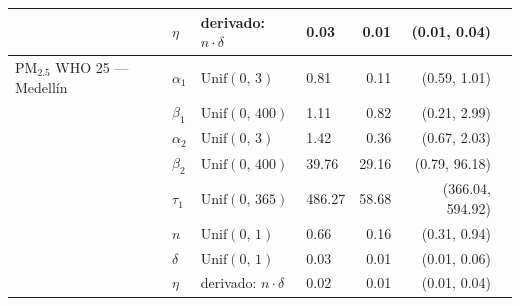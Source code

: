 \begin{longtable}{llllrrr}
 & $\eta$ & derivado: $n \cdot \delta$ & 0.03 & 0.01 & (0.01, 0.04) \\
\midrule
PM$_{2.5}$ WHO 25 --- Medell\'{i}n & $\alpha_{1}$ & $\text{Unif}(0,\,3)$ & 0.81 & 0.11 & (0.59, 1.01) \\
 & $\beta_{1}$ & $\text{Unif}(0,\,400)$ & 1.11 & 0.82 & (0.21, 2.99) \\
 & $\alpha_{2}$ & $\text{Unif}(0,\,3)$ & 1.42 & 0.36 & (0.67, 2.03) \\
 & $\beta_{2}$ & $\text{Unif}(0,\,400)$ & 39.76 & 29.16 & (0.79, 96.18) \\
 & $\tau_{1}$ & $\text{Unif}(0,\,365)$ & 486.27 & 58.68 & (366.04, 594.92) \\
 & $n$ & $\text{Unif}(0,\,1)$ & 0.66 & 0.16 & (0.31, 0.94) \\
 & $\delta$ & $\text{Unif}(0,\,1)$ & 0.03 & 0.01 & (0.01, 0.06) \\
 & $\eta$ & derivado: $n \cdot \delta$ & 0.02 & 0.01 & (0.01, 0.04) \\
\end{longtable}
